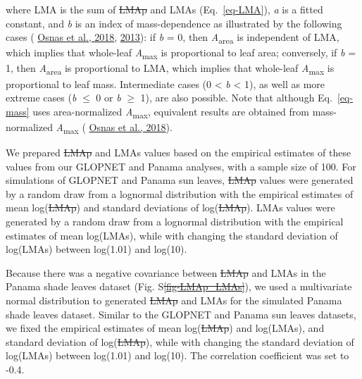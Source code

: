 \documentclass[
  12pt,
  a4paper,
,tablecaptionabove
]{scrartcl}
\providecommand{\DIFaddtex}[1]{{\protect\color{blue}\uwave{#1}}} %
\providecommand{\DIFdeltex}[1]{{\protect\color{red}\sout{#1}}}                      %
\providecommand{\DIFaddbegin}{} %
\providecommand{\DIFaddend}{} %
\providecommand{\DIFdelbegin}{} %
\providecommand{\DIFdelend}{} %
\providecommand{\DIFadd}[1]{\texorpdfstring{\DIFaddtex{#1}}{#1}} %
\providecommand{\DIFdel}[1]{\texorpdfstring{\DIFdeltex{#1}}{}} %
\newcommand{\DIFscaledelfig}{0.5}
\newlength{\DIFdelgraphicswidth} %
\newlength{\DIFdelgraphicsheight} %
\newcommand{\DIFaddincludegraphics}[2][]{{\color{blue}\fbox{\DIFOincludegraphics[#1]{#2}}}} %
\newcommand{\DIFdelincludegraphics}[2][]{%
\sbox{\DIFdelgraphicsbox}{\DIFOincludegraphics[#1]{#2}}%
\settoboxwidth{\DIFdelgraphicswidth}{\DIFdelgraphicsbox} %
\settoboxtotalheight{\DIFdelgraphicsheight}{\DIFdelgraphicsbox} %
\scalebox{\DIFscaledelfig}{%
\parbox[b]{\DIFdelgraphicswidth}{\usebox{\DIFdelgraphicsbox}\\[-\baselineskip] \rule{\DIFdelgraphicswidth}{0em}}\llap{\resizebox{\DIFdelgraphicswidth}{\DIFdelgraphicsheight}{%
\setlength{\unitlength}{\DIFdelgraphicswidth}%
\begin{picture}(1,1)%
\thicklines\linethickness{2pt} %
{\color[rgb]{1,0,0}\put(0,0){\framebox(1,1){}}}%
{\color[rgb]{1,0,0}\put(0,0){\line( 1,1){1}}}%
{\color[rgb]{1,0,0}\put(0,1){\line(1,-1){1}}}%
\end{picture}%
}\hspace*{3pt}}} %
} %
\DeclareRobustCommand{\DIFaddbegin}{\DIFOaddbegin \let\includegraphics\DIFaddincludegraphics} %
\DeclareRobustCommand{\DIFaddend}{\DIFOaddend \let\includegraphics\DIFOincludegraphics} %
\DeclareRobustCommand{\DIFdelbegin}{\DIFOdelbegin \let\includegraphics\DIFdelincludegraphics} %
\DeclareRobustCommand{\DIFdelend}{\DIFOaddend \let\includegraphics\DIFOincludegraphics} %
\begin{document}
where LMA is the sum of \DIFdelbegin \DIFdel{LMAp }\DIFdelend \DIFaddbegin \DIFadd{LMAm }\DIFaddend and LMAs (Eq.~\ref{eq-LMA}), \emph{a} is a
fitted constant, and \emph{b} is an index of mass-dependence as
illustrated by the following cases
(\protect\DIFdelbegin %
\DIFdelend \DIFaddbegin \hyperlink{ref-Osnas2018}{Osnas et al., 2018}\DIFaddend ,
\protect\DIFdelbegin %
\DIFdelend \DIFaddbegin \hyperlink{ref-Osnas2013}{2013}\DIFaddend ): if \emph{b} = 0, then
\emph{A}\textsubscript{area} is independent of LMA, which implies that
whole-leaf \emph{A}\textsubscript{max} is proportional to leaf area;
conversely, if \emph{b} = 1, then \emph{A}\textsubscript{area} is
proportional to LMA, which implies that whole-leaf
\emph{A}\textsubscript{max} is proportional to leaf mass. Intermediate
cases (0 \textless{} \emph{b} \textless{} 1), as well as more extreme
cases (\emph{b} \(\leq\) 0 or \emph{b} \(\geq\) 1), are also possible.
Note that although Eq.~\ref{eq-mass} uses area-normalized
\emph{A}\textsubscript{max}, equivalent results are obtained from
mass-normalized \emph{A}\textsubscript{max}
(\protect\DIFdelbegin %
\DIFdelend \DIFaddbegin \hyperlink{ref-Osnas2018}{Osnas et al., 2018}\DIFaddend ).

We prepared \DIFdelbegin \DIFdel{LMAp }\DIFdelend \DIFaddbegin \DIFadd{LMAm }\DIFaddend and LMAs values based on the empirical estimates of
these values from our GLOPNET and Panama analyses, with a sample size of
100. For simulations of GLOPNET and Panama sun leaves, \DIFdelbegin \DIFdel{LMAp }\DIFdelend \DIFaddbegin \DIFadd{LMAm }\DIFaddend values were
generated by a random draw from a lognormal distribution with the
empirical estimates of mean log(\DIFdelbegin \DIFdel{LMAp}\DIFdelend \DIFaddbegin \DIFadd{LMAm}\DIFaddend ) and standard deviations of
log(\DIFdelbegin \DIFdel{LMAp}\DIFdelend \DIFaddbegin \DIFadd{LMAm}\DIFaddend ). LMAs values were generated by a random draw from a lognormal
distribution with the empirical estimates of mean log(LMAs), while with
changing the standard deviation of log(LMAs) between log(1.01) and
log(10).

Because there was a negative covariance between \DIFdelbegin \DIFdel{LMAp }\DIFdelend \DIFaddbegin \DIFadd{LMAm }\DIFaddend and LMAs in the
Panama shade leaves dataset (Fig. S\DIFdelbegin \DIFdel{\ref{fig-LMAp_LMAs}}\DIFdelend \DIFaddbegin \DIFadd{\ref{fig-LMAm_LMAs}}\DIFaddend ), we used a
multivariate normal distribution to generated \DIFdelbegin \DIFdel{LMAp }\DIFdelend \DIFaddbegin \DIFadd{LMAm }\DIFaddend and LMAs for the
simulated Panama shade leaves dataset. Similar to the GLOPNET and Panama
sun leaves datasets, we fixed the empirical estimates of mean log(\DIFdelbegin \DIFdel{LMAp}\DIFdelend \DIFaddbegin \DIFadd{LMAm}\DIFaddend )
and log(LMAs), and standard deviation of log(\DIFdelbegin \DIFdel{LMAp}\DIFdelend \DIFaddbegin \DIFadd{LMAm}\DIFaddend ), while with changing
the standard deviation of log(LMAs) between log(1.01) and log(10). The
correlation coefficient was set to -0.4.
\end{document}
